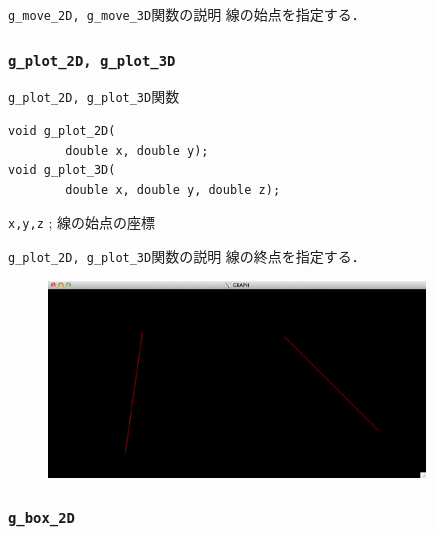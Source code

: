 \documentclass[platex,a4paper,12pt]{jsarticle}%
\begin{document}
\begin{itembox}[l]{\texttt{g\_move\_2D, g\_move\_3D}関数の説明}
線の始点を指定する．
\end{itembox}

\subsubsection{\texttt{g\_plot\_2D, g\_plot\_3D}}

\begin{itembox}[l]{\texttt{g\_plot\_2D, g\_plot\_3D}関数}
\begin{verbatim}
void g_plot_2D(
        double x, double y);
void g_plot_3D(
        double x, double y, double z);     
\end{verbatim}
\verb|x,y,z| ; 線の始点の座標\\
\end{itembox}

\begin{itembox}[l]{\texttt{g\_plot\_2D, g\_plot\_3D}関数の説明}
線の終点を指定する．
\end{itembox}

\begin{figure}[htb]
\centering
\includegraphics[width=100mm]{Canvas_g_move_g_plot.eps}
\end{figure}


\clearpage
\subsubsection{\texttt{g\_box\_2D}}
\end{document}
